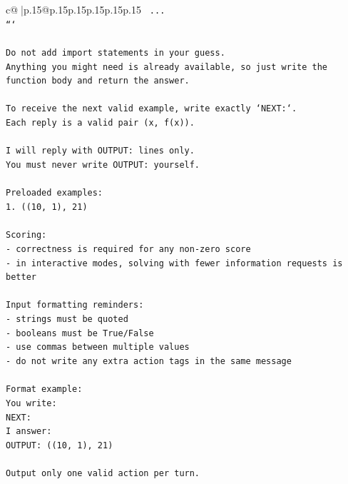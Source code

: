 \documentclass{article}
\begin{document}
{\begin{supertabular}{c@{$\;$}|p{.15\linewidth}@{}p{.15\linewidth}p{.15\linewidth}p{.15\linewidth}p{.15\linewidth}p{.15\linewidth}}
{{{\texttt{    ...} \\
\texttt{```} \\
\\ 
\texttt{Do not add import statements in your guess.} \\
\texttt{Anything you might need is already available, so just write the function body and return the answer.} \\
\\ 
\texttt{To receive the next valid example, write exactly `NEXT:`.} \\
\texttt{Each reply is a valid pair (x, f(x)).} \\
\\ 
\texttt{I will reply with OUTPUT: lines only.} \\
\texttt{You must never write OUTPUT: yourself.} \\
\\ 
\texttt{Preloaded examples:} \\
\texttt{1. ((10, 1), 21)} \\
\\ 
\texttt{Scoring:} \\
\texttt{{-} correctness is required for any non{-}zero score} \\
\texttt{{-} in interactive modes, solving with fewer information requests is better} \\
\\ 
\texttt{Input formatting reminders:} \\
\texttt{{-} strings must be quoted} \\
\texttt{{-} booleans must be True/False} \\
\texttt{{-} use commas between multiple values} \\
\texttt{{-} do not write any extra action tags in the same message} \\
\\ 
\texttt{Format example:} \\
\texttt{You write:} \\
\texttt{NEXT:} \\
\texttt{I answer:} \\
\texttt{OUTPUT: ((10, 1), 21)} \\
\\ 
\texttt{Output only one valid action per turn.} \\
            }
        }
    }
     \\ \\


\end{supertabular}}
\end{document}
